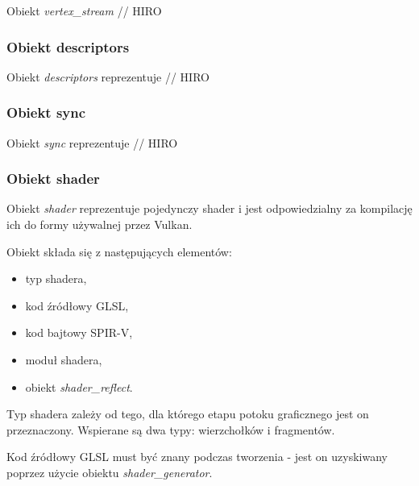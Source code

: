 Obiekt \textit{vertex\_stream} // HIRO
 
\subsubsection{Obiekt descriptors}
Obiekt \textit{descriptors} reprezentuje 
// HIRO

\subsubsection{Obiekt sync}
Obiekt \textit{sync} reprezentuje 
// HIRO

\subsubsection{Obiekt shader}
Obiekt \textit{shader} reprezentuje pojedynczy shader i jest odpowiedzialny za kompilację ich do formy używalnej przez Vulkan.

Obiekt składa się z następujących elementów:
\begin{itemize}
	\item typ shadera,
	\item kod źródłowy GLSL,
	\item kod bajtowy SPIR-V,
	\item moduł shadera,
	\item obiekt \textit{shader\_reflect}.
\end{itemize}

Typ shadera zależy od tego, dla którego etapu potoku graficznego jest on przeznaczony.
Wspierane są dwa typy: wierzchołków i fragmentów.

Kod źródłowy GLSL must być znany podczas tworzenia - jest on uzyskiwany poprzez użycie obiektu \textit{shader\_generator}.

